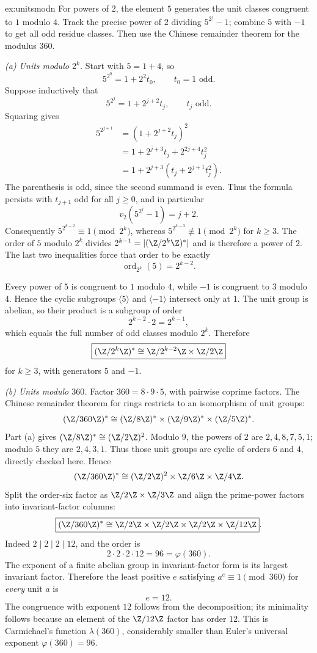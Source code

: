 \begin{solution}{ex:unitsmodn}
\idea For powers of $2$, the element $5$ generates the unit classes congruent to $1$ modulo $4$. Track the precise power of $2$ dividing $5^{2^j}-1$; combine $5$ with $-1$ to get all odd residue classes. Then use the Chinese remainder theorem for the modulus $360$.

\writeup \emph{(a) Units modulo $2^k$.} Start with $5=1+4$, so
\[
5^{2^0}=1+2^2t_0,\qquad t_0=1\text{ odd}.
\]
Suppose inductively that
\[
5^{2^j}=1+2^{j+2}t_j,\qquad t_j\text{ odd}.
\]
Squaring gives
\[
\begin{aligned}
5^{2^{j+1}}
&=(1+2^{j+2}t_j)^2\\
&=1+2^{j+3}t_j+2^{2j+4}t_j^2\\
&=1+2^{j+3}(t_j+2^{j+1}t_j^2).
\end{aligned}
\]
The parenthesis is odd, since the second summand is even. Thus the formula persists with $t_{j+1}$ odd for all $j\ge0$, and in particular
\[
v_2(5^{2^j}-1)=j+2.
\]
Consequently $5^{2^{k-2}}\equiv1\pmod{2^k}$, whereas $5^{2^{k-3}}\not\equiv1\pmod{2^k}$ for $k\ge3$. The order of $5$ modulo $2^k$ divides $2^{k-1}=|(\Z/2^k\Z)^*|$ and is therefore a power of $2$. The last two inequalities force that order to be exactly
\[
\operatorname{ord}_{2^k}(5)=2^{k-2}.
\]

Every power of $5$ is congruent to $1$ modulo $4$, while $-1$ is congruent to $3$ modulo $4$. Hence the cyclic subgroups $\langle5\rangle$ and $\langle-1\rangle$ intersect only at $1$. The unit group is abelian, so their product is a subgroup of order
\[
2^{k-2}\cdot2=2^{k-1},
\]
which equals the full number of odd classes modulo $2^k$. Therefore
\[
\boxed{(\Z/2^k\Z)^*
\cong\Z/2^{k-2}\Z\times\Z/2\Z}
\]
for $k\ge3$, with generators $5$ and $-1$.

\emph{(b) Units modulo $360$.} Factor $360=8\cdot9\cdot5$, with pairwise coprime factors. The Chinese remainder theorem for rings restricts to an isomorphism of unit groups:
\[
(\Z/360\Z)^*
\cong(\Z/8\Z)^*\times(\Z/9\Z)^*\times(\Z/5\Z)^*.
\]
Part (a) gives $(\Z/8\Z)^*\cong(\Z/2\Z)^2$. Modulo $9$, the powers of $2$ are $2,4,8,7,5,1$; modulo $5$ they are $2,4,3,1$. Thus those unit groups are cyclic of orders $6$ and $4$, directly checked here. Hence
\[
(\Z/360\Z)^*
\cong(\Z/2\Z)^2\times\Z/6\Z\times\Z/4\Z.
\]
Split the order-six factor as $\Z/2\Z\times\Z/3\Z$ and align the prime-power factors into invariant-factor columns:
\[
\boxed{(\Z/360\Z)^*
\cong\Z/2\Z\times\Z/2\Z\times\Z/2\Z\times\Z/12\Z}.
\]
Indeed $2\mid2\mid2\mid12$, and the order is
\[
2\cdot2\cdot2\cdot12=96=\varphi(360).
\]
The exponent of a finite abelian group in invariant-factor form is its largest invariant factor. Therefore the least positive $e$ satisfying $a^e\equiv1\pmod{360}$ for \emph{every} unit $a$ is
\[
\boxed{e=12}.
\]
The congruence with exponent $12$ follows from the decomposition; its minimality follows because an element of the $\Z/12\Z$ factor has order $12$. This is Carmichael's function $\lambda(360)$, considerably smaller than Euler's universal exponent $\varphi(360)=96$.
\end{solution}

